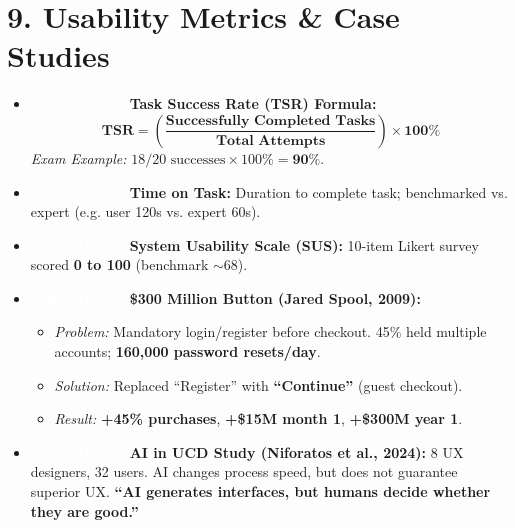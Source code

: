 \documentclass[8.5pt,a4paper,twocolumn]{article}
\newcommand{\tagmem}{\colorbox{accentred}{\textcolor{white}{\bfseries\fontsize{5.5pt}{6.5pt}\selectfont MEMORIZE}}\ }
\begin{document}
\section*{9. Usability Metrics \& Case Studies}
\begin{itemize}[leftmargin=7pt, itemsep=1pt, topsep=0.5pt]
    \item \tagmem \textbf{Task Success Rate (TSR) Formula:}
    \[\mathbf{TSR = \left(\frac{\text{Successfully Completed Tasks}}{\text{Total Attempts}}\right) \times 100\%}\]
    \textit{Exam Example:} $18 / 20 \text{ successes} \times 100\% = \mathbf{90\%}$.
    \item \tagmem \textbf{Time on Task:} Duration to complete task; benchmarked vs. expert (e.g. user 120s vs. expert 60s).
    \item \tagmem \textbf{System Usability Scale (SUS):} 10-item Likert survey scored \textbf{0 to 100} (benchmark $\sim 68$).
    \item \tagmem \textbf{\$300 Million Button (Jared Spool, 2009):}
    \begin{itemize}[leftmargin=6pt, itemsep=0.5pt]
        \item \textit{Problem:} Mandatory login/register before checkout. 45\% held multiple accounts; \textbf{160,000 password resets/day}.
        \item \textit{Solution:} Replaced ``Register'' with \textbf{``Continue''} (guest checkout).
        \item \textit{Result:} \textbf{+45\% purchases}, \textbf{+\$15M month 1}, \textbf{+\$300M year 1}.
    \end{itemize}
    \item \tagmem \textbf{AI in UCD Study (Niforatos et al., 2024):} 8 UX designers, 32 users. AI changes process speed, but does not guarantee superior UX. \textbf{``AI generates interfaces, but humans decide whether they are good.''}
\end{itemize}

\newpage
\end{document}
